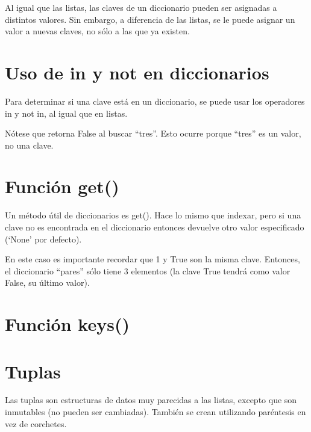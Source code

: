 \documentclass{report}
\newcommand{\simple}[1]{`#1'}
\newcommand{\doble}[1]{``#1''}
\begin{document}
Al igual que las listas, las claves de un diccionario pueden ser asignadas a distintos valores. Sin embargo, a diferencia de las listas, se le puede asignar un valor a nuevas claves, no sólo a las que ya existen.


\section{Uso de in y not en diccionarios}

Para determinar si una clave está en un diccionario, se puede usar los operadores in y not in, al igual que en listas.


Nótese que retorna False al buscar \doble{tres}. Esto ocurre porque \doble{tres} es un valor, no una clave.

\section{Función get()}

Un método útil de diccionarios es get(). Hace lo mismo que indexar, pero si una clave no es encontrada en el diccionario entonces devuelve otro valor especificado (\simple{None} por defecto).


En este caso es importante recordar que 1 y True son la misma clave. Entonces, el diccionario \doble{pares} sólo tiene 3 elementos (la clave True tendrá como valor False, su último valor).


\section{Función keys()}

\section{Tuplas}

Las tuplas son estructuras de datos muy parecidas a las listas, excepto que son inmutables (no pueden ser cambiadas). También se crean utilizando paréntesis en vez de corchetes.

\end{document}
